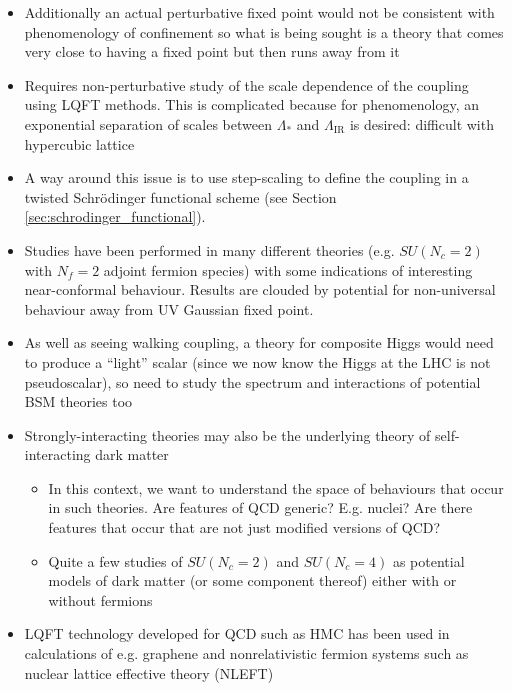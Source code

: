 \begin{itemize}
\begin{figure}
\caption{Various trajectories for the coupling $g$ for different values of the number of colours and fermion flavours, showing the possibility of an IR fixed point.
\label{fig:conformal_fp}}
\end{figure}

    \item Additionally an actual perturbative fixed point would not be consistent with phenomenology of confinement so what is being sought is a theory that comes very close to having a fixed point but then runs away from it
    \item Requires non-perturbative study of the scale dependence of the coupling using LQFT methods. This is complicated because for phenomenology, an exponential separation of scales between $\Lambda_*$ and $\Lambda_{\text{IR}}$ is desired: difficult with hypercubic lattice
    \item A way around this issue is to use step-scaling to define the coupling in a twisted Schr\"odinger functional scheme (see Section \ref{sec:schrodinger_functional}).
    

    \item Studies have been performed in many different theories (e.g. $SU(N_c=2)$ with $N_f = 2$ adjoint fermion species) with some indications of interesting near-conformal behaviour. Results are clouded by potential for non-universal behaviour away from UV Gaussian fixed point.
    \item As well as seeing walking coupling, a theory for composite Higgs would need to produce a ``light'' scalar (since we now know the Higgs at the LHC is not pseudoscalar), so need to study the spectrum and interactions of potential BSM theories too
    \item Strongly-interacting theories may also be the underlying theory of self-interacting dark matter
    \begin{itemize}
        \item In this context, we want to understand the space of behaviours that occur in such theories. Are features of QCD generic? E.g. nuclei? Are there features that occur that are not just modified versions of QCD?
        \item Quite a few studies of $SU(N_c = 2)$ and $SU(N_c = 4)$ as potential models of dark matter (or some component thereof) either with or without fermions
    \end{itemize}
    \item LQFT technology developed for QCD such as HMC has been used in calculations of e.g. graphene and nonrelativistic fermion systems such as nuclear lattice effective theory (NLEFT)
\end{itemize}
